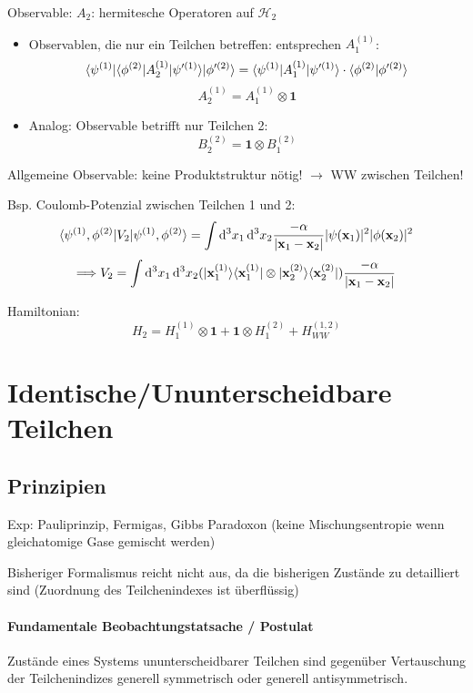 \documentclass[11pt,a4paper]{report}
\begin{document}
Observable: $A_2$: hermitesche Operatoren auf $\mathcal{H}_2$
\begin{itemize}
\item Observablen, die nur ein Teilchen betreffen: entsprechen $A_1^{(1)}$:
$$\langle \psi^{(1)} |\langle \phi^{(2)} | A_2^{(1)} |\psi'^{(1)}\rangle|\phi'^{(2)}\rangle = \langle \psi^{(1)}|A_1^{(1)}|\psi'^{(1)}\rangle\cdot\langle \phi^{(2)} | \phi'^{(2)} \rangle$$
$$A_2^{(1)}=A_1^{(1)}\otimes\mathbf{1}$$
\item Analog: Observable betrifft nur Teilchen 2:
$$B_2^{(2)}=\mathbf{1}\otimes B_1^{(2)}$$
\end{itemize}
Allgemeine Observable: keine Produktstruktur nötig! $\rightarrow$ WW zwischen Teilchen!\par 
Bsp. Coulomb-Potenzial zwischen Teilchen 1 und 2:
$$\langle \psi^{(1)},\phi^{(2)}|V_2|\psi^{(1)},\phi^{(2)}\rangle=\int\mathrm{d}^3x_1\,\mathrm{d}^3x_2\frac{-\alpha}{|\mathbf{x}_1-\mathbf{x}_2|}|\psi (\mathbf{x}_1)|^2 |\phi (\mathbf{x}_2)|^2$$
$$\Longrightarrow V_2 = \int\mathrm{d}^3x_1\,\mathrm{d}^3x_2 (|\mathbf{x}_1^{(1)}\rangle\langle \mathbf{x}_1^{(1)} |\otimes |\mathbf{x}_2^{(2)}\rangle\langle \mathbf{x}_2^{(2)} |)\frac{-\alpha}{|\mathbf{x}_1-\mathbf{x}_2|}$$

Hamiltonian:
$$H_2=H_1^{(1)}\otimes\mathbf{1} + \mathbf{1}\otimes H_1^{(2)}+H_{WW}^{(1,2)}$$

\section{Identische/Ununterscheidbare Teilchen}

\subsection{Prinzipien}

Exp: Pauliprinzip, Fermigas, Gibbs Paradoxon (keine Mischungsentropie wenn gleichatomige Gase gemischt werden)\par 

Bisheriger Formalismus reicht nicht aus, da die bisherigen Zustände zu detailliert sind (Zuordnung des Teilchenindexes ist überflüssig)\par 

\paragraph{Fundamentale Beobachtungstatsache / Postulat} Zustände eines Systems ununterscheidbarer Teilchen sind gegenüber Vertauschung der Teilchenindizes generell symmetrisch oder generell antisymmetrisch.
\end{document}
